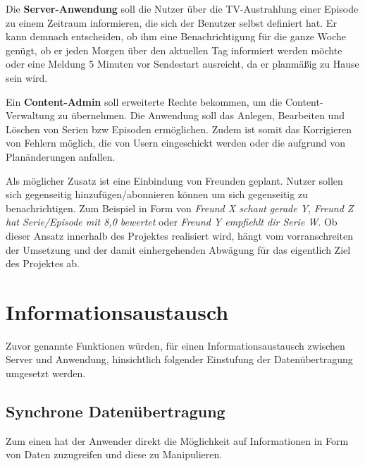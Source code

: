 \vspace{0.2cm}

Die \textbf{Server-Anwendung} soll die Nutzer über die TV-Austrahlung einer Episode zu einem Zeitraum informieren, die sich der Benutzer selbst definiert hat. Er kann demnach entscheiden, ob ihm eine Benachrichtigung für die ganze Woche genügt, ob er jeden Morgen über den aktuellen Tag informiert werden möchte oder eine Meldung 5 Minuten vor Sendestart ausreicht, da er planmäßig zu Hause sein wird.

\vspace{0.2cm}

Ein \textbf{Content-Admin} soll erweiterte Rechte bekommen, um die Content-Verwaltung zu übernehmen. Die Anwendung soll das Anlegen, Bearbeiten und Löschen von Serien bzw Episoden ermöglichen. Zudem ist somit das Korrigieren von Fehlern möglich, die von Usern eingeschickt werden oder die aufgrund von Planänderungen anfallen.

\vspace{0.2cm}

Als möglicher Zusatz ist eine Einbindung von Freunden geplant. Nutzer sollen sich gegenseitig hinzufügen/abonnieren können um sich gegenseitig zu benachrichtigen. Zum Beispiel in Form von \textit{Freund X schaut gerade Y}, \textit{Freund Z hat Serie/Episode mit 8,0 bewertet} oder \textit{Freund Y empfiehlt dir Serie W}. Ob dieser Ansatz innerhalb des Projektes realisiert wird, hängt vom vorranschreiten der Umsetzung  und der damit einhergehenden Abwägung für das eigentlich Ziel des Projektes ab.

\section{Informationsaustausch}

Zuvor genannte Funktionen würden, für einen Informationsaustausch zwischen Server und Anwendung, hinsichtlich folgender Einstufung der Datenübertragung umgesetzt werden.

\subsection{Synchrone Datenübertragung}

Zum einen hat der Anwender direkt die Möglichkeit auf Informationen in Form von Daten zuzugreifen und diese zu Manipulieren.

